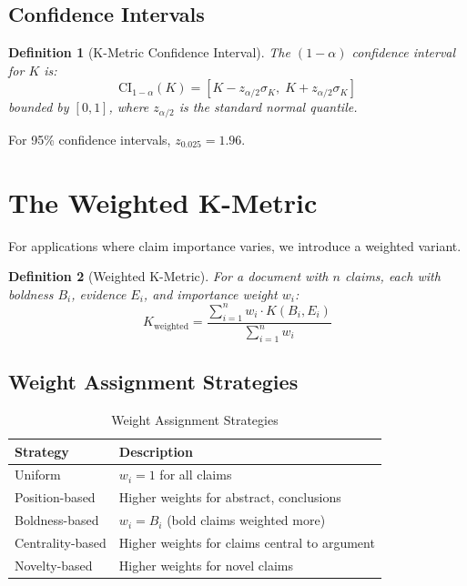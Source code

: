 \documentclass[11pt,a4paper]{article}
\newtheorem{definition}{Definition}[section]
\theoremstyle{remark}
\begin{document}
\subsection{Confidence Intervals}

\begin{definition}[K-Metric Confidence Interval]
\label{def:k-ci}
The $(1 - \alpha)$ confidence interval for $K$ is:
\begin{equation}
\text{CI}_{1-\alpha}(K) = \left[ K - z_{\alpha/2} \sigma_K, \; K + z_{\alpha/2} \sigma_K \right]
\end{equation}
bounded by $[0, 1]$, where $z_{\alpha/2}$ is the standard normal quantile.
\end{definition}

For 95\% confidence intervals, $z_{0.025} = 1.96$.


\section{The Weighted K-Metric}
\label{sec:weighted}

For applications where claim importance varies, we introduce a weighted variant.

\begin{definition}[Weighted K-Metric]
\label{def:k-weighted}
For a document with $n$ claims, each with boldness $B_i$, evidence $E_i$, and importance weight $w_i$:
\begin{equation}
K_{\text{weighted}} = \frac{\sum_{i=1}^{n} w_i \cdot K(B_i, E_i)}{\sum_{i=1}^{n} w_i}
\end{equation}
\end{definition}

\subsection{Weight Assignment Strategies}

\begin{table}[h]
\centering
\caption{Weight Assignment Strategies}
\label{tab:weights}
\begin{tabular}{lp{7cm}}
\toprule
\textbf{Strategy} & \textbf{Description} \\
\midrule
Uniform & $w_i = 1$ for all claims \\
Position-based & Higher weights for abstract, conclusions \\
Boldness-based & $w_i = B_i$ (bold claims weighted more) \\
Centrality-based & Higher weights for claims central to argument \\
Novelty-based & Higher weights for novel claims \\
\bottomrule
\end{tabular}
\end{table}
\end{document}
